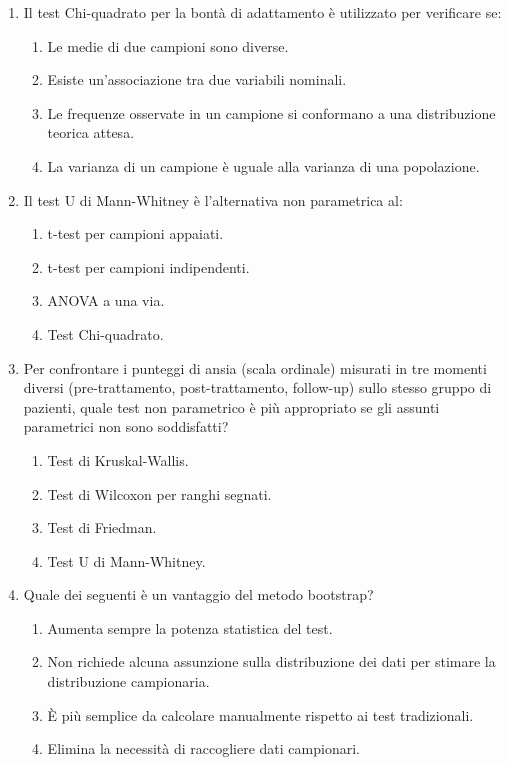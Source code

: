 \documentclass[12pt, a4paper]{article}
\begin{document}
\begin{enumerate}[resume]
    \item Il test Chi-quadrato per la bontà di adattamento è utilizzato per verificare se:
    \begin{enumerate}
        \item Le medie di due campioni sono diverse.
        \item Esiste un'associazione tra due variabili nominali.
        \item Le frequenze osservate in un campione si conformano a una distribuzione teorica attesa.
        \item La varianza di un campione è uguale alla varianza di una popolazione.
    \end{enumerate}
    \vspace{0.3cm}

    \item Il test U di Mann-Whitney è l'alternativa non parametrica al:
    \begin{enumerate}
        \item t-test per campioni appaiati.
        \item t-test per campioni indipendenti.
        \item ANOVA a una via.
        \item Test Chi-quadrato.
    \end{enumerate}
    \vspace{0.3cm}

    \item Per confrontare i punteggi di ansia (scala ordinale) misurati in tre momenti diversi (pre-trattamento, post-trattamento, follow-up) sullo stesso gruppo di pazienti, quale test non parametrico è più appropriato se gli assunti parametrici non sono soddisfatti?
    \begin{enumerate}
        \item Test di Kruskal-Wallis.
        \item Test di Wilcoxon per ranghi segnati.
        \item Test di Friedman.
        \item Test U di Mann-Whitney.
    \end{enumerate}
    \vspace{0.3cm}

    \item Quale dei seguenti è un vantaggio del metodo bootstrap?
    \begin{enumerate}
        \item Aumenta sempre la potenza statistica del test.
        \item Non richiede alcuna assunzione sulla distribuzione dei dati per stimare la distribuzione campionaria.
        \item È più semplice da calcolare manualmente rispetto ai test tradizionali.
        \item Elimina la necessità di raccogliere dati campionari.
    \end{enumerate}
    \vspace{0.3cm}


\end{enumerate}
\end{document}

